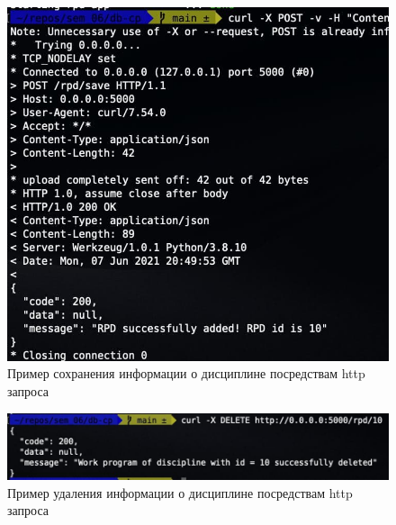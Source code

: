\begin{figure}[h!]
	\begin{center}
		\includegraphics[scale=0.8]{img/save_example.jpg}
	\end{center}
	\captionsetup{justification=centering}
	\caption{Пример сохранения информации о дисциплине посредствам http запроса}
	\label{img:save-example}
\end{figure}
\newpage

\begin{figure}[h!]
	\begin{center}
		\includegraphics[scale=0.65]{img/delete_example.jpg}
	\end{center}
	\captionsetup{justification=centering}
	\caption{Пример удаления информации о дисциплине посредствам http запроса}
	\label{img:delete-example}
\end{figure}
\newpage


